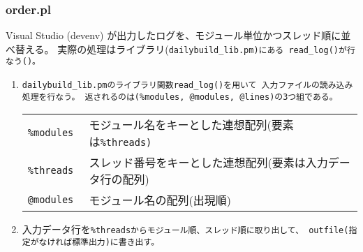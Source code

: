 \subsubsection{order.pl}
\label{subsubsec:order}

\medskip
\noindent
Visual Studio (devenv) が出力したログを、モジュール単位かつスレッド順に並べ替える。
実際の処理はライブラリ(\tt{dailybuild\_lib.pm})にある
\tt{read_log()}が行なう()。

\medskip
{}
\begin{Opts}[b][6em]
\end{Opts}
\begin{Args}[b][6em]
\end{Args}

\begin{Proc}[b]
\begin{enumerate}
  \item	\tt{dailybuild\_lib.pm}のライブラリ関数\tt{read\_log()}を用いて
	入力ファイルの読み込み処理を行なう。
	返されるのは(\tt{\%modules, @modules, @lines})の3つ組である。\\
	{\small
	\begin{narrow}[10pt]\begin{tabular}{ll}
	    \tt{\%modules}
		& モジュール名をキーとした連想配列(要素は\tt{\%threads})\\
	    \tt{\%threads}
		& スレッド番号をキーとした連想配列(要素は入力データ行の配列)\\
	    \tt{@modules}
		& モジュール名の配列(出現順)
	\end{tabular}\end{narrow}
	}

  \item	入力データ行を\tt{\%threads}からモジュール順、スレッド順に取り出して、
	\tt{outfile}(指定がなければ標準出力)に書き出す。

\end{enumerate}
\end{Proc}

